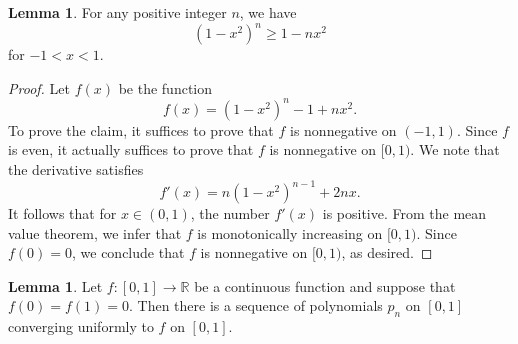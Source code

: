 \documentclass[12pt]{article}
\theoremstyle{definition}
\theoremstyle{theorem}
\newtheorem{lemma}[definition]{Lemma}
\begin{document}
\begin{lemma}
For any positive integer $n$, we have 
\[
(1-x^2)^n \geqslant 1 - n x^2
\]
for $-1 < x < 1$. 
\end{lemma}

\begin{proof}
Let $f(x)$ be the function 
\[
f(x) = (1-x^2)^n -1 + nx^2. 
\]
To prove the claim, it suffices to prove that $f$ is nonnegative on $(-1,1)$. Since $f$ is even, it actually suffices to prove that $f$ is nonnegative on $[0,1)$. We note that the derivative satisfies  
\[
f'(x) = n(1-x^2)^{n-1} + 2nx.
\]
It follows that for $x \in (0,1)$, the number $f'(x)$ is positive. From the mean value theorem, we infer that $f$ is monotonically increasing on $[0,1)$. Since $f(0) = 0$, we conclude that $f$ is nonnegative on $[0,1)$, as desired. 
\end{proof}

\begin{lemma}
Let $f : [0,1] \to \mathbb{R}$ be a continuous function and suppose that $f(0) = f(1) = 0$. Then there is a sequence of polynomials $p_n$ on $[0,1]$ converging uniformly to $f$ on $[0,1]$.
\end{lemma}
\end{document}
